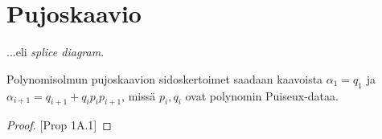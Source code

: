 \section{Pujoskaavio}

...eli \emph{splice diagram}.
\begin{propositio}
    Polynomisolmun pujoskaavion sidoskertoimet saadaan kaavoista $\alpha_1=q_1$ ja $\alpha_{i+1}=q_{i+1}+q_i p_i p_{i+1}$, missä $p_i,q_i$ ovat polynomin Puiseux-dataa.
\end{propositio}
\begin{proof}
    \citep{EN1985}[Prop 1A.1]
\end{proof}